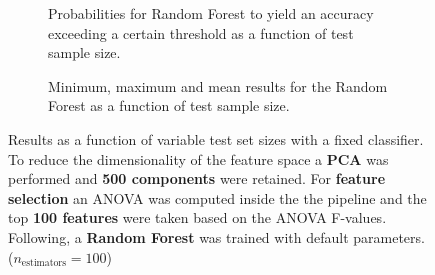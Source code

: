 \begin{figure}
    \captionsetup[subfigure]{justification=justified,singlelinecheck=false}
    \begin{subfigure}[t]{0.61\textwidth}
        
        \caption{Probabilities for Random Forest to yield an accuracy exceeding a certain threshold as a function of test sample size.}
    \end{subfigure}
    \hspace{3.0mm}
    \begin{subfigure}[t]{0.34\textwidth}
        
        \caption{Minimum, maximum and mean results for the Random Forest as a function of test sample size.}
    \end{subfigure}
    \caption[Effects of varying test sample size. Random Forest; Preprocessing: PCA ($n_\text{components} = \num{500}$); ANOVA feature selection ($k_\text{best} = \num{100}$)]{Results as a function of variable test set sizes with a fixed classifier. To reduce the dimensionality of the feature space a \textbf{PCA} was performed and \textbf{500 components} were retained. For \textbf{feature selection} an ANOVA was computed inside the the pipeline and the top \textbf{100 features} were taken based on the ANOVA F-values. Following, a \textbf{{Random Forest}} was trained with default parameters. ($n_\text{estimators}=\num{100}$)}
    \label{fig:PCA_500_components_100_best_selected_RandomForest}
\end{figure}

